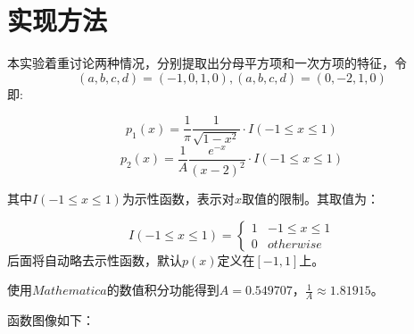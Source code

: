 \documentclass[UTF8]{ctexart}
\begin{document}
	\section{实现方法}
	\begin{flushleft}
		本实验着重讨论两种情况，分别提取出分母平方项和一次方项的特征，令$$(a,b,c,d)=(-1,0,1,0),(a,b,c,d)=(0,-2,1,0)$$
	即:
	\end{flushleft}
	$$p_1(x)=\frac{1}{\pi}\frac{1}{\sqrt{1-x^2}}\cdot I(-1\leq x\leq 1)$$
	$$p_2(x)=\frac{1}{A}\frac{e^{-x}}{{(x-2)}^2}\cdot I(-1\leq x\leq1)$$
\begin{flushleft}
		其中$I(-1\leq x\leq1)$为示性函数，表示对$x$取值的限制。其取值为：
\end{flushleft}
	$$I(-1\leq x\leq1)=\left\{
	\begin{array}{lr}
	1&-1\leq x\leq 1\\
	0& otherwise
	\end{array}
	\right.$$
	后面将自动略去示性函数，默认$p(x)$定义在$[-1,1]$上。
	\begin{flushleft}
		使用$Mathematica$的数值积分功能得到$A=0.549707$，$\frac{1}{A}\approx1.81915$。
	
		函数图像如下：
	\end{flushleft}
	
\end{document}
